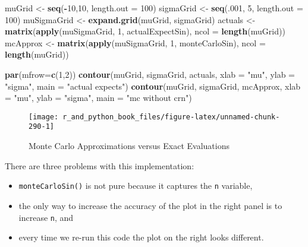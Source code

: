 \documentclass[12pt,krantz2]{krantz}
\makeatletter
\newenvironment{Shaded}{\begin{snugshade}}{\end{snugshade}}
\newcommand{\DataTypeTok}[1]{\textcolor[rgb]{0.27,0.27,0.27}{#1}}
\newcommand{\DecValTok}[1]{\textcolor[rgb]{0.06,0.06,0.06}{#1}}
\newcommand{\KeywordTok}[1]{\textcolor[rgb]{0.27,0.27,0.27}{\textbf{#1}}}
\newcommand{\NormalTok}[1]{#1}
\newcommand{\OperatorTok}[1]{\textcolor[rgb]{0.43,0.43,0.43}{\textbf{#1}}}
\newcommand{\StringTok}[1]{\textcolor[rgb]{0.5,0.5,0.5}{#1}}
\providecommand{\tightlist}{%
  \setlength{\itemsep}{0pt}\setlength{\parskip}{0pt}}
\newenvironment{kframe}{%
\medskip{}
\setlength{\fboxsep}{.8em}
 \def\at@end@of@kframe{}%
 \ifinner\ifhmode%
  \def\at@end@of@kframe{\end{minipage}}%
  \begin{minipage}{\columnwidth}%
 \fi\fi%
 \def\FrameCommand##1{\hskip\@totalleftmargin \hskip-\fboxsep
 \colorbox{shadecolor}{##1}\hskip-\fboxsep
     \hskip-\linewidth \hskip-\@totalleftmargin \hskip\columnwidth}%
 \MakeFramed {\advance\hsize-\width
   \@totalleftmargin\z@ \linewidth\hsize
   \@setminipage}}%
 {\par\unskip\endMakeFramed%
 \at@end@of@kframe}
\renewenvironment{Shaded}{\begin{kframe}}{\end{kframe}}
\makeatother
\begin{document}
\begin{Shaded}
\begin{Highlighting}[]
\NormalTok{muGrid <-}\StringTok{ }\KeywordTok{seq}\NormalTok{(}\OperatorTok{-}\DecValTok{10}\NormalTok{,}\DecValTok{10}\NormalTok{, }\DataTypeTok{length.out =} \DecValTok{100}\NormalTok{)}
\NormalTok{sigmaGrid <-}\StringTok{ }\KeywordTok{seq}\NormalTok{(.}\DecValTok{001}\NormalTok{, }\DecValTok{5}\NormalTok{, }\DataTypeTok{length.out =} \DecValTok{100}\NormalTok{)}
\NormalTok{muSigmaGrid <-}\StringTok{ }\KeywordTok{expand.grid}\NormalTok{(muGrid, sigmaGrid)}
\NormalTok{actuals <-}\StringTok{  }\KeywordTok{matrix}\NormalTok{(}\KeywordTok{apply}\NormalTok{(muSigmaGrid, }\DecValTok{1}\NormalTok{, actualExpectSin), }
                   \DataTypeTok{ncol =} \KeywordTok{length}\NormalTok{(muGrid))}
\NormalTok{mcApprox <-}\StringTok{ }\KeywordTok{matrix}\NormalTok{(}\KeywordTok{apply}\NormalTok{(muSigmaGrid, }\DecValTok{1}\NormalTok{, monteCarloSin), }
                   \DataTypeTok{ncol =} \KeywordTok{length}\NormalTok{(muGrid))}

\KeywordTok{par}\NormalTok{(}\DataTypeTok{mfrow=}\KeywordTok{c}\NormalTok{(}\DecValTok{1}\NormalTok{,}\DecValTok{2}\NormalTok{))}
\KeywordTok{contour}\NormalTok{(muGrid, sigmaGrid, actuals, }
        \DataTypeTok{xlab =} \StringTok{"mu"}\NormalTok{, }\DataTypeTok{ylab =} \StringTok{"sigma"}\NormalTok{, }\DataTypeTok{main =} \StringTok{"actual expects"}\NormalTok{)}
\KeywordTok{contour}\NormalTok{(muGrid, sigmaGrid, mcApprox, }
        \DataTypeTok{xlab =} \StringTok{"mu"}\NormalTok{, }\DataTypeTok{ylab =} \StringTok{"sigma"}\NormalTok{, }\DataTypeTok{main =} \StringTok{"mc without crn"}\NormalTok{)}
\end{Highlighting}
\end{Shaded}

\begin{figure}

{\centering \texttt{[image: r\_and\_python\_book\_files/figure-latex/unnamed-chunk-290-1]} 

}

\caption{Monte Carlo Approximations versus Exact Evaluations}\label{fig:unnamed-chunk-290}
\end{figure}

There are three problems with this implementation:

\begin{itemize}
\tightlist
\item
  \texttt{monteCarloSin()} is not pure because it captures the \texttt{n} variable,
\item
  the only way to increase the accuracy of the plot in the right panel is to increase \texttt{n}, and
\item
  every time we re-run this code the plot on the right looks different.
\end{itemize}
\end{document}
